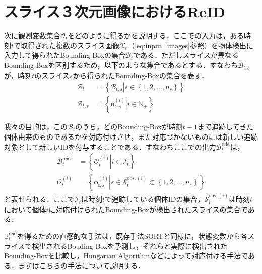 \section{スライス３次元画像におけるReID}

次に観測変数集合$\mathcal{O}_t$をどのように得るかを説明する．ここでの入力は，ある時刻$t$で取得された複数のスライス画像$\mathcal{X}_t$（\ref{eq:input_images}参照）を物体検出に入力して得られたBounding-Boxの集合$\mathcal{B}_t$である．ただしスライスが異なるBounding-Boxを区別するため，以下のような集合であるとする．すなわち$\mathcal{B}_{t,s}$が，時刻$t$のスライス$s$から得られたBounding-Boxの集合を表す．
\begin{equation}
    \label{eq:input_bboxes}
    \begin{aligned}
        \mathcal{B}_t &= \left\{\left.\mathcal{B}_{t,s}\right|s \in \left\{1,2,\dots,n_s\right\}\right\}
        \\\mathcal{B}_{t,s} &= \left\{\left.\bm{o}_{t,s}^{(i)}\right|i \in \mathbb{N}_{+}\right\}
    \end{aligned}
\end{equation}

我々の目的は，この$\mathcal{B}_t$のうち，どのBounding-Boxが時刻$t-1$まで追跡してきた個体由来のものであるかを対応付けさせ，また対応づかないものには新しい追跡対象として新しいIDを付与することである．すなわちここでの出力$\mathcal{B}_t^{\text{reid}}$は，
\begin{equation}
    \begin{aligned}
        \mathcal{B}_t^{\text{reid}} &= \left\{\left.\mathcal{O}_t^{(i)}\right| i \in \mathcal{I}_t\right\}
        \\ \mathcal{O}_t^{(i)} &= \left\{\left.\bm{o}_{t,s}^{(i)}\right| s \in \mathcal{S}_t^{\text{obs},(i)} \subset \left\{1,2,\dots,n_s\right\}\right\}
    \end{aligned}
\end{equation}
と表せられる．ここで$\mathcal{I}_t$は時刻$t$で追跡している個体IDの集合，$\mathcal{S}_t^{\text{obs},(i)}$は時刻$t$において個体$i$に対応付けられたBounding-Boxが検出されたスライスの集合である．
\par
$\mathbb{B}_t^{\text{reid}}$を得るための直感的な手法は，既存手法SORTと同様に，状態変数から各スライスで検出されるBouding-Boxを予測し，それらと実際に検出されたBounding-Boxを比較し，Hungarian Algorithmなどによって対応付ける手法である．まずはこちらの手法について説明する．

